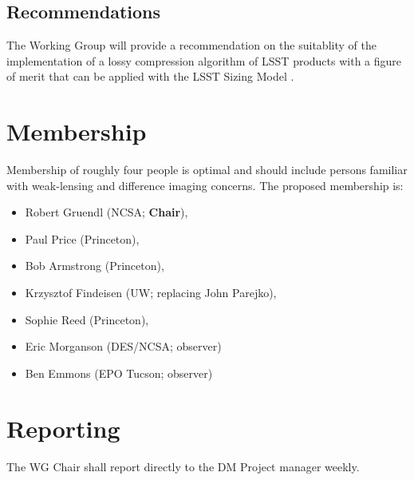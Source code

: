 \subsection{Recommendations}

The Working Group will provide a recommendation on the suitablity of the implementation
of a lossy compression algorithm of LSST products with a figure of merit that can be
applied with the LSST Sizing Model .


\section{Membership}

Membership of roughly four people is optimal and should include persons familiar
with weak-lensing and difference imaging concerns.
The proposed membership is:

\begin{itemize}
    \item Robert Gruendl (NCSA; \textbf{Chair}),
    \item Paul Price (Princeton),
    \item Bob Armstrong (Princeton),
    \item Krzysztof Findeisen (UW; replacing John Parejko),
    \item Sophie Reed (Princeton),
    \item Eric Morganson (DES/NCSA; observer)
    \item Ben Emmons (EPO Tucson; observer)
\end{itemize}


\section{Reporting}

The WG Chair shall report directly to the DM Project manager weekly.
